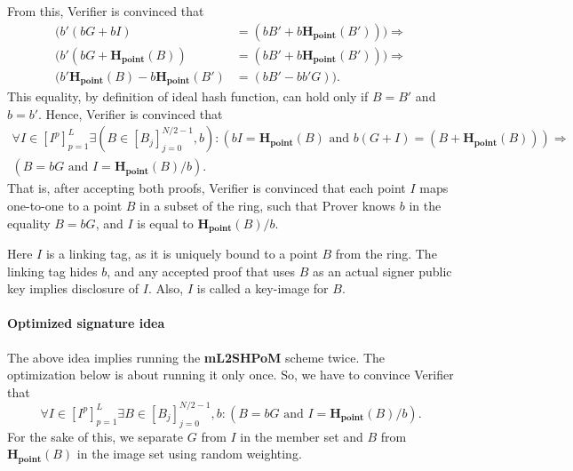 \documentclass{mathcryptology} %
\newcommand{\Hpoint}{\textbf{H}_{\textbf{point}}}
\theoremstyle{title}
\theoremstyle{titleof}
\begin{document}
    From this, Verifier is convinced that
    \begin{align*}
        (b'(bG+bI) & = (bB'+b \Hpoint(B'))) \Rightarrow\\
        (b'(bG+\Hpoint(B)) & = (bB'+b\Hpoint(B')))\Rightarrow\\
        (b'\Hpoint(B)-b\Hpoint(B') & =(bB'-bb'G)).
    \end{align*}
    This equality, by definition of ideal hash function, can hold only if $B=B'$ and $b=b'$. Hence, Verifier is convinced that
    \begin{gather*}
        \forall I\in {\left[I^{p}\right]}_{p=1}^{L} \exists \left(
        B\in {\left[B_{j}\right]}_{j=0}^{N/2-1},b \right):
        \left( bI = \Hpoint\left(B\right) \text{ and }
        b\left(G+I\right)=\left(B+ \Hpoint \left(B\right)\right)\right) \Rightarrow\\
        \left(B=bG \text{ and } I=\Hpoint \left(B\right)/b \right).
    \end{gather*}
    That is, after accepting both proofs, Verifier is convinced that each point $I$ maps one-to-one to a point $B$ in a subset of the ring, such that Prover knows $b$ in the equality $B=bG$, and $I$ is equal to $\Hpoint\left(B\right)/b$.

    Here $I$ is a linking tag, as it is uniquely bound to a point $B$ from the ring. The linking tag hides
    $b$, and any accepted proof that uses $B$ as an actual signer public key implies disclosure of
    $I$. Also, $I$ is called a key-image for $B$.


\paragraph{Optimized signature idea}\label{Sec:8.3.1.1.}
    The above idea implies running the \textbf{mL2SHPoM} scheme twice. The optimization below is about running it only once.
    So, we have to convince Verifier that
    \begin{equation*}
        \forall I\in{\left[I^{p}\right]}_{p=1}^{L} \exists
        B\in {\left[B_{j}\right]}_{j=0}^{N/2-1},b:
        \left(B=bG \text{ and }
        I = \Hpoint \left(B\right)/b\right).
    \end{equation*}
    For the sake of this, we separate $G$ from $I$ in the member set and $B$ from $\Hpoint\left(B\right)$ in the image set using random weighting.
\end{document}
